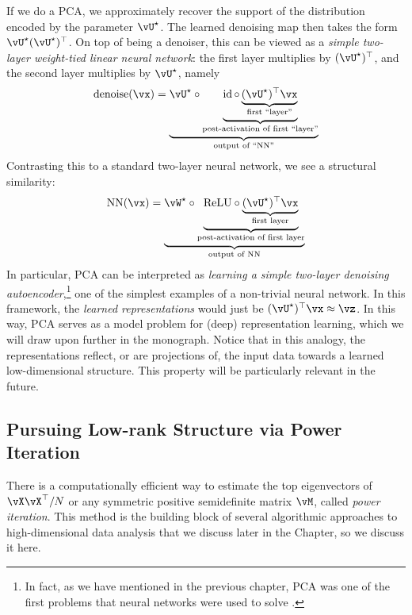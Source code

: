 \documentclass[../../book-main.tex]{subfiles}
\begin{document}
\begin{remark}
    If we do a PCA, we approximately recover the support of the distribution
    encoded by the parameter \(\vU^{\star}\). The learned denoising map then
    takes the form \(\vU^{\star}(\vU^{\star})^{\top}\). On top of being
    a denoiser, this can be viewed as a \textit{simple two-layer weight-tied
    linear neural network}: the first layer multiplies by
    \((\vU^{\star})^{\top}\), and the second layer multiplies by \(\vU^{\star}\), namely
    \begin{equation}
        \operatorname{denoise}(\vx) = \underbrace{\vU^{\star} \circ
        \underbrace{\id \circ \underbrace{(\vU^{\star})^{\top}\vx}_{\text{first ``layer''}}}_{\text{post-activation of first ``layer''}}}_{\text{output of ``NN''}}
    \end{equation}
    Contrasting this to a standard two-layer neural network, we see a structural similarity:
    \begin{equation}
        \operatorname{NN}(\vx) = \underbrace{\vW^{\star} \circ
        \underbrace{\mathrm{ReLU} \circ \underbrace{(\vU^{\star})^{\top}\vx}_{\text{first layer}}}_{\text{post-activation of first layer}}}_{\text{output of NN}}
    \end{equation}
    In particular, PCA can be interpreted as \textit{learning a simple two-layer
    denoising autoencoder},\footnote{In fact, as we have mentioned in the
    previous chapter, PCA was one of the first problems that neural networks
    were used to solve \cite{Oja1982SimplifiedNM,Baldi89}.} one of the simplest
    examples of a non-trivial neural network. In this framework, the
    \textit{learned representations} would just be \((\vU^{\star})^{\top}\vx \approx \vz\). In this way, PCA serves as a model problem for (deep) representation learning, which we will draw upon further in the monograph. Notice that in this analogy, the representations reflect, or are projections of, the input data towards a learned low-dimensional structure. This property will be particularly relevant in the future.
\end{remark}

\subsection{Pursuing Low-rank Structure via Power Iteration}\label{subsec:power iterations}

There is a computationally efficient way to estimate the top eigenvectors of \(\vX\vX^{\top}/N\) or any symmetric positive semidefinite matrix \(\vM\), called \textit{power iteration}. This method is the building block of several algorithmic approaches to high-dimensional data analysis that we discuss later in the Chapter, so we discuss it here. 
\end{document}
